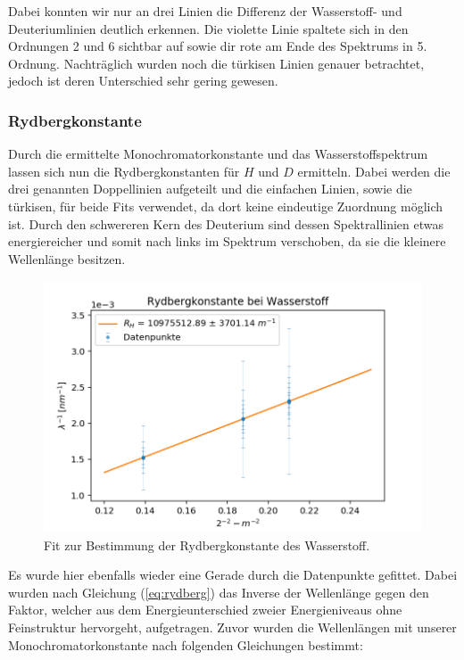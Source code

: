 \documentclass[]{article}
\begin{document}
Dabei konnten wir nur an drei Linien die Differenz der Wasserstoff- und Deuteriumlinien deutlich erkennen. Die violette Linie spaltete sich in den Ordnungen 2 und 6 sichtbar auf sowie dir rote am Ende des Spektrums in 5. Ordnung. Nachträglich wurden noch die türkisen Linien genauer betrachtet, jedoch ist deren Unterschied sehr gering gewesen.



\subsubsection{Rydbergkonstante}
Durch die ermittelte Monochromatorkonstante und das Wasserstoffspektrum lassen sich nun die Rydbergkonstanten für $H$ und $D$ ermitteln. Dabei werden die drei genannten Doppellinien aufgeteilt und die einfachen Linien, sowie die türkisen, für beide Fits verwendet, da dort keine eindeutige Zuordnung möglich ist. Durch den schwereren Kern des Deuterium sind dessen Spektrallinien etwas energiereicher und somit nach links im Spektrum verschoben, da sie die kleinere Wellenlänge besitzen. 

\begin{figure}[H]
\centering
\includegraphics[width=1\textwidth]{Plots/R_H.png}
\caption{ Fit zur Bestimmung der Rydbergkonstante des Wasserstoff.}
\label{fig:Rydberg H}
\end{figure}

Es wurde hier ebenfalls wieder eine Gerade durch die Datenpunkte gefittet. Dabei wurden nach Gleichung (\ref{eq:rydberg}) das Inverse der Wellenlänge gegen den Faktor, welcher aus dem Energieunterschied zweier Energieniveaus ohne Feinstruktur hervorgeht, aufgetragen. Zuvor wurden die Wellenlängen mit unserer Monochromatorkonstante nach folgenden Gleichungen bestimmt:
\end{document}
